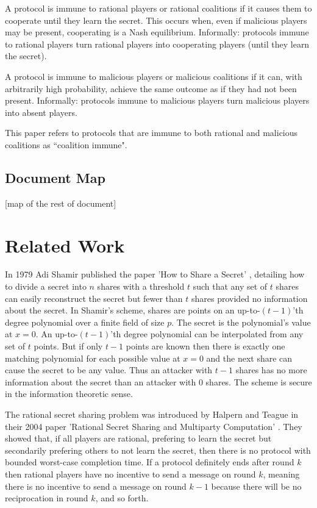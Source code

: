 \documentclass{dalcsthesis}
\begin{document}
A protocol is immune to rational players or rational coalitions if it causes them to cooperate until they learn the secret. This occurs when, even if malicious players may be present, cooperating is a Nash equilibrium. Informally: protocols immune to rational players turn rational players into cooperating players (until they learn the secret).

A protocol is immune to malicious players or malicious coalitions if it can, with arbitrarily high probability, achieve the same outcome as if they had not been present. Informally: protocols immune to malicious players turn malicious players into absent players.

This paper refers to protocols that are immune to both rational and malicious coalitions as ``coalition immune".

\section{Document Map}

[map of the rest of document]

\chapter{Related Work}
\label{sec:RelatedWork}

In 1979 Adi Shamir published the paper 'How to Share a Secret' \cite{shamir79}, detailing how to divide a secret into $n$ shares with a threshold $t$ such that any set of $t$ shares can easily reconstruct the secret but fewer than $t$ shares provided no information about the secret. In Shamir's scheme, shares are points on an up-to-$(t-1)$'th degree polynomial over a finite field of size $p$. The secret is the polynomial's value at $x=0$. An up-to-$(t-1)$'th degree polynomial can be interpolated from any set of $t$ points. But if only $t-1$ points are known then there is exactly one matching polynomial for each possible value at $x=0$ and the next share can cause the secret to be any value. Thus an attacker with $t-1$ shares has no more information about the secret than an attacker with $0$ shares. The scheme is secure in the information theoretic sense.

The rational secret sharing problem was introduced by Halpern and Teague in their 2004 paper 'Rational Secret Sharing and Multiparty Computation' \cite{halpern04}. They showed that, if all players are rational, prefering to learn the secret but secondarily prefering others to not learn the secret, then there is no protocol with bounded worst-case completion time. If a protocol definitely ends after round $k$ then rational players have no incentive to send a message on round $k$, meaning there is no incentive to send a message on round $k-1$ because there will be no reciprocation in round $k$, and so forth.
\end{document}
